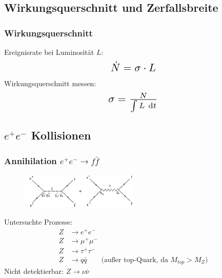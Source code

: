 \subsection{Wirkungsquerschnitt und Zerfallsbreite}
\begin{frame}
	\frametitle{Wirkungsquerschnitt}
	\hspace{1cm} Ereignisrate bei Luminosität $L$:
	\begin{equation*}
	\scalebox{1.5}{$\dot{N} = \sigma \cdot L$}
	\end{equation*}
	\hspace{1cm} Wirkungsquerschnitt messen:
	\begin{equation*}
	\scalebox{1.5}{$\sigma = \frac{N}{\int L~\text{d}t}$}
	\end{equation*}
\end{frame}
\subsection{$e^+e^-$ Kollisionen}
\begin{frame}
	\frametitle{Annihilation $e^+e^- \rightarrow f\bar{f}$ }
	\begin{center}
		\begin{figure}
			\includegraphics[width=0.5\textwidth]{graphics/annihilation.png}
		\end{figure}
	\end{center}
	Untersuchte Prozesse:\\
	\begin{equation*}
	\begin{aligned}
	Z &\rightarrow e^+e^-\\
	Z &\rightarrow \mu^+\mu^-\\
	Z &\rightarrow \tau^+\tau^-\\
	Z &\rightarrow q\bar{q} \qquad\text{(außer top-Quark, da $M_{top} > M_Z$)}
	\end{aligned}
	\end{equation*}
	Nicht detektierbar:
	$Z \rightarrow \nu \bar\nu$
\end{frame}	
